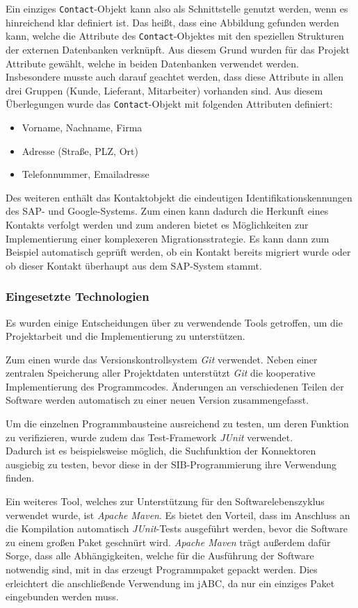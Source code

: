 Ein einziges \lstinline{Contact}-Objekt kann also als Schnittstelle genutzt werden, wenn es hinreichend klar definiert ist.
Das heißt, dass eine Abbildung gefunden werden kann, welche die Attribute des \lstinline{Contact}-Objektes mit den speziellen
 Strukturen der externen Datenbanken verknüpft.
Aus diesem Grund wurden für das Projekt Attribute gewählt, welche in beiden Datenbanken verwendet werden.
Insbesondere musste auch darauf geachtet werden, dass diese Attribute in allen drei Gruppen (Kunde, Lieferant,
 Mitarbeiter) vorhanden sind.
Aus diesem Überlegungen wurde das \lstinline{Contact}-Objekt mit folgenden Attributen definiert:
\begin{itemize}
	\item Vorname, Nachname, Firma
	\item Adresse (Straße, PLZ, Ort)
	\item Telefonnummer, Emailadresse
\end{itemize}
Des weiteren enthält das Kontaktobjekt die eindeutigen Identifikationskennungen des SAP- und Google-Systems.
Zum einen kann dadurch die Herkunft eines Kontakts verfolgt werden und zum anderen bietet es Möglichkeiten
 zur Implementierung einer komplexeren Migrationsstrategie.
Es kann dann zum Beispiel automatisch geprüft werden, ob ein Kontakt bereits migriert wurde oder ob dieser
 Kontakt überhaupt aus dem SAP-System stammt.
	
\subsubsection{Eingesetzte Technologien}
Es wurden einige Entscheidungen über zu verwendende Tools getroffen, um die Projektarbeit und die
 Implementierung zu unterstützen.
 
Zum einen wurde das Versionskontrollsystem \emph{Git} verwendet.
Neben einer zentralen Speicherung aller Projektdaten unterstützt \emph{Git} die kooperative Implementierung des Programmcodes.
Änderungen an verschiedenen Teilen der Software werden automatisch zu einer neuen Version zusammengefasst.

Um die einzelnen Programmbausteine ausreichend zu testen, um deren Funktion zu verifizieren, wurde zudem das
 Test-Framework \emph{JUnit} verwendet. \\ Dadurch ist es beispielsweise möglich, die Suchfunktion der Konnektoren ausgiebig
 zu testen, bevor diese in der SIB-Programmierung ihre Verwendung finden.

Ein weiteres Tool, welches zur Unterstützung für den Softwarelebenszyklus verwendet wurde, ist \emph{Apache Maven}.
Es bietet den Vorteil, dass im Anschluss an die Kompilation automatisch \emph{JUnit}-Tests ausgeführt werden, bevor
 die Software zu einem großen Paket geschnürt wird.
 \emph{Apache Maven} trägt außerdem dafür Sorge, dass alle Abhängigkeiten, welche für die Ausführung der Software
  notwendig sind, mit in das erzeugt Programmpaket gepackt werden.
 Dies erleichtert die anschließende Verwendung im jABC, da nur ein einziges Paket eingebunden werden muss.

